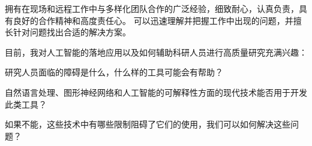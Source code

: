 

\begin{cvparagraph}

拥有在现场和远程工作中与多样化团队合作的广泛经验，细致耐心，认真负责，具有良好的合作精神和高度责任心。
可以迅速理解并把握工作中出现的问题，并擅长针对问题找出合适的解决方案。

目前，我对人工智能的落地应用以及如何辅助科研人员进行高质量研究充满兴趣：
\\
\begin{cvitems}
    \item{研究人员面临的障碍是什么，什么样的工具可能会有帮助？}
    \item {自然语言处理、图形神经网络和人工智能的可解释性方面的现代技术能否用于开发此类工具？}
    \item {如果不能，这些技术中有哪些限制阻碍了它们的使用，我们可以如何解决这些问题？}
\end{cvitems}

\end{cvparagraph}
